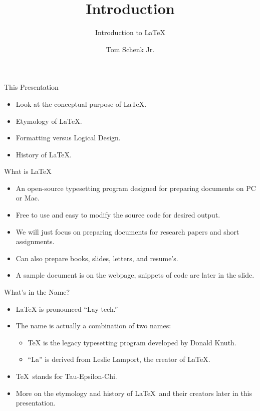 \documentclass[pdf]{prosper}
\title{Introduction}
\subtitle{Introduction to \LaTeX}
\author{Tom Schenk Jr.}		%
\begin{document}
\maketitle
\begin{slide}{This Presentation}
	\begin{itemize}
		\item Look at the conceptual purpose of \LaTeX.
		\item Etymology of \LaTeX.
		\item Formatting versus Logical Design.
		\item History of \LaTeX.
	\end{itemize}
\end{slide}
\begin{slide}{What is \LaTeX\?}
	\begin{itemize}
		\item An open-source typesetting program designed for preparing documents on PC or Mac.
		\item Free to use and easy to modify the source code for desired output.
		\item We will just focus on preparing documents for research papers and short assignments.
		\item Can also prepare books, slides, letters, and resume's.
		\item A sample document is on the webpage, snippets of code are later in the slide.
	\end{itemize}
\end{slide}
\begin{slide}{What's in the Name?}
	\begin{itemize}
		\item \LaTeX\mbox{} is pronounced ``Lay-tech.''
		\item The name is actually a combination of two names:
			\begin{itemize}
				\item \TeX\mbox{} is the legacy typesetting program developed by Donald Knuth.
				\item ``La'' is derived from Leslie Lamport, the creator of \LaTeX.
			\end{itemize}
		\item \TeX\ stands for Tau-Epsilon-Chi.
		\item More on the etymology and history of \LaTeX\ and their creators later in this presentation.
	\end{itemize}
\end{slide}
\end{document}
